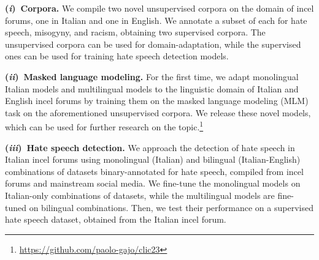 \documentclass[11pt]{article}
\newcommand{\Ni}{({\em i})~}
\newcommand{\Nii}{({\em ii})~}
\newcommand{\Niii}{({\em iii})~}
\newcommand{\mbert}{\mbox{mBERT$_{base}$}}
\newcommand{\umbert}{\mbox{UmBERTo}}
\newcommand{\albert}{\mbox{AlBERTo}}
\newcommand{\enforum}{\textit{Incels.is}}
\newcommand{\itforum}{\textit{Il forum dei brutti}}
\begin{document}
\vspace*{1mm}\noindent\textbf{\Ni Corpora.} We compile two novel unsupervised corpora on the domain of incel forums, one in Italian and one in English. We annotate a subset of each for hate speech, misogyny, and racism, obtaining two supervised corpora. The unsupervised corpora can be used for domain-adaptation, while the supervised ones can be used for training hate speech detection models.

\vspace*{1mm}\noindent\textbf{\Nii Masked language modeling.} For the first time, we adapt monolingual Italian models and multilingual models to the linguistic domain of Italian and English incel forums by training them on the masked language modeling (MLM) task on the aforementioned unsupervised corpora. We release these novel models, which can be used for further research on the topic.\footnote{\url{https://github.com/paolo-gajo/clic23}}

\vspace*{1mm}\noindent\textbf{\Niii Hate speech detection.} We approach the detection of hate speech in Italian incel forums using monolingual (Italian) and bilingual (Italian-English) combinations of datasets binary-annotated for hate speech, compiled from incel forums and mainstream social media. We fine-tune the monolingual models on Italian-only combinations of datasets, while the multilingual models are fine-tuned on bilingual combinations. Then, we test their performance on a supervised hate speech dataset, obtained from the Italian incel forum.



\end{document}
